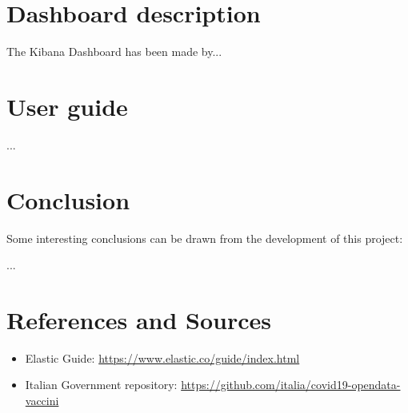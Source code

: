 \documentclass{article}
\begin{document}
\section{Dashboard description}
The Kibana Dashboard has been made by...

\newpage

\section{User guide}
...

\section{Conclusion}

Some interesting conclusions can be drawn from the development of this project:

...

\section{References and Sources}
\begin{itemize}
    \item Elastic Guide: \url{https://www.elastic.co/guide/index.html}
    \item Italian Government repository: \url{https://github.com/italia/covid19-opendata-vaccini}
    
\end{itemize}
\end{document}
